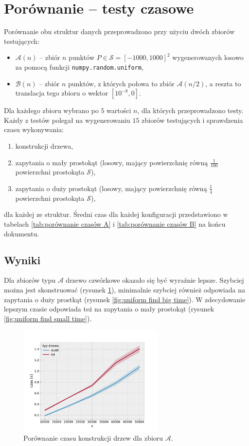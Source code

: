 \documentclass[12pt]{scrartcl}
\newcommand{\sA}{\mathcal A}
\newcommand{\sB}{\mathcal B}
\newcommand{\sS}{\mathcal S}
\begin{document}
\section{Porównanie -- testy czasowe}
Porównanie obu struktur danych przeprowadzono przy użyciu dwóch zbiorów testujących:
\begin{itemize}
    \item $\sA(n)$ -- zbiór $n$ punktów $P \in \sS = [-1000, 1000]^2$ wygenerowanych losowo za pomocą funkcji \texttt{numpy.random.uniform},
    \item $\sB(n)$ -- zbiór $n$ punktów, z których połowa to zbiór $\sA(n/2)$, a reszta to translacja tego zbioru o wektor $[10^{-8}, 0]$.
\end{itemize}

Dla każdego zbioru wybrano po $5$ wartości $n$, dla których przeprowadzono testy. Każdy z testów polegał na wygenerowaniu $15$ zbiorów testujących i sprawdzenia czasu wykonywania:
\begin{enumerate}
    \item konstrukcji drzewa,
    \item zapytania o mały prostokąt (losowy, mający powierzchnię równą $\frac{1}{100}$ powierzchni prostokąta $\sS$),
    \item zapytania o duży prostokąt (losowy, mający powierzchnię równą $\frac{1}{4}$ powierzchni prostokąta $\sS$),
\end{enumerate}
dla każdej ze struktur. Średni czas dla każdej konfiguracji przedstawiono w tabelach \ref{tab:porównanie czasów A} i \ref{tab:porównanie czasów B} na końcu dokumentu.

\subsection{Wyniki}

Dla zbiorów typu $\sA$ drzewo czwórkowe okazało się być wyraźnie lepsze. Szybciej można jest skonstruować (rysunek \ref{fig:uniform construction time}), minimalnie szybciej również odpowiada na zapytania o duży prostkąt (rysunek \ref{fig:uniform find big time}). W zdecydowanie lepszym czasie odpowiada też na zapytania o mały prostokąt (rysunek \ref{fig:uniform find small time}).

\begin{figure}[H]
    \centering
    \includegraphics[width=0.65\textwidth]{imgs/uniform_construction_time}
    \caption{Porównanie czasu konstrukcji drzew dla zbioru $\sA$.}
    \label{fig:uniform construction time}
\end{figure}
\end{document}
